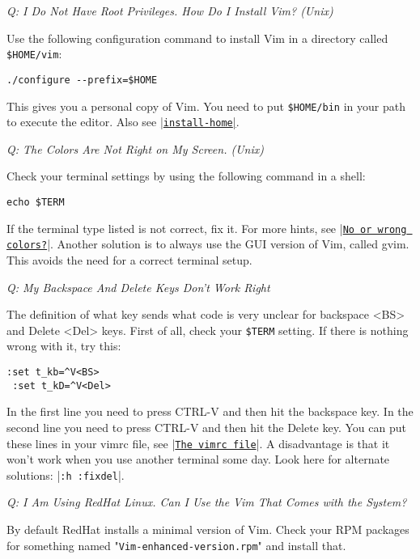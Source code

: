 \textit{Q: I Do Not Have Root Privileges.  How Do I Install Vim? (Unix)}

Use the following configuration command to install Vim in a directory called \verb!$HOME/vim!:

\begin{Verbatim}[samepage=true]
 ./configure --prefix=$HOME
\end{Verbatim}

This gives you a personal copy of Vim.  You need to put \verb!$HOME/bin! in your
path to execute the editor.  Also see \hyperref[install-home]{|\texttt{install-home}|}.

\textit{Q: The Colors Are Not Right on My Screen. (Unix)}

Check your terminal settings by using the following command in a shell:

\begin{Verbatim}[samepage=true]
 echo $TERM
\end{Verbatim}

If the terminal type listed is not correct, fix it.
For more hints, see |\hyperref[No or wrong colors?]{\texttt{No or wrong colors?}}|.
Another solution is to always use the GUI version of Vim, called gvim.
This avoids the need for a correct terminal setup.

\textit{Q: My Backspace And Delete Keys Don't Work Right}

The definition of what key sends what code is very unclear for backspace <BS> and Delete <Del> keys.
First of all, check your \verb!$TERM! setting.
If there is nothing wrong with it, try this:

\begin{Verbatim}[samepage=true]
 :set t_kb=^V<BS>
 :set t_kD=^V<Del>
\end{Verbatim}

In the first line you need to press CTRL-V and then hit the backspace key.
In the second line you need to press CTRL-V and then hit the Delete key.
You can put these lines in your vimrc file, see |\hyperref[The vimrc file]{\texttt{The vimrc file}}|.
A disadvantage is that it won't work when you use another terminal some day.
Look here for alternate solutions: |\verb!:h :fixdel!|.

\textit{Q: I Am Using RedHat Linux.  Can I Use the Vim That Comes with the System?}

By default RedHat installs a minimal version of Vim.
Check your RPM packages for something named "\verb!Vim-enhanced-version.rpm!" and install that.

